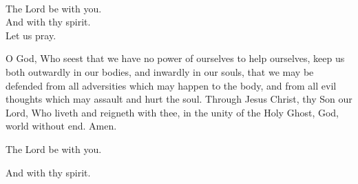\\
  \rubric{\Vbar}The Lord be with you.
\\
  \rubric{\Rbar}And with thy spirit.
\\
Let us pray.

O God, Who seest that we have no power of ourselves to help ourselves, keep us both outwardly in our bodies, and inwardly in our souls, that we may be defended from all adversities which may happen to the body, and from all evil thoughts which may assault and hurt the soul. Through Jesus Christ, thy Son our Lord, Who liveth and reigneth with thee, in the unity of the Holy Ghost, God, world without end. \rubric{\Rbar} Amen.

  \rubric{\Vbar}The Lord be with you.

  \rubric{\Rbar}And with thy spirit.

